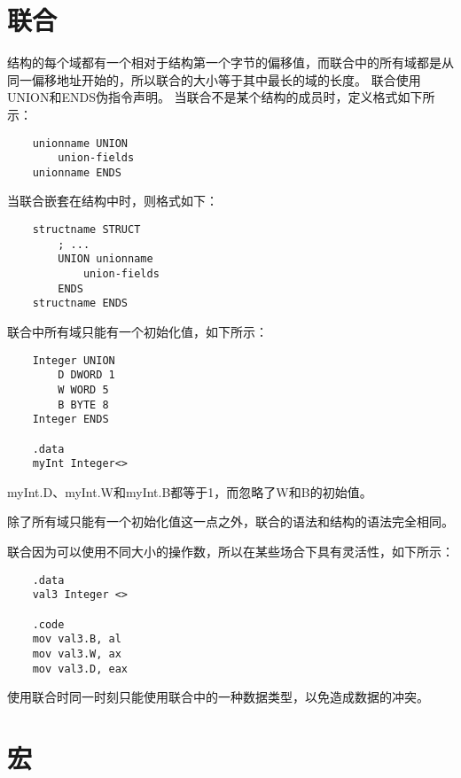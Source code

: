 \documentclass[a4paper,left=2.5cm,right=2.5cm,11pt]{article}
\begin{document}
\section{联合}
	结构的每个域都有一个相对于结构第一个字节的偏移值，而联合中的所有域都是从同一偏移地址开始的，所以联合的大小等于其中最长的域的长度。
	联合使用UNION和ENDS伪指令声明。
	当联合不是某个结构的成员时，定义格式如下所示：
	\begin{lstlisting}
	unionname UNION
		union-fields
	unionname ENDS
	\end{lstlisting}

	当联合嵌套在结构中时，则格式如下：
	\begin{lstlisting}
	structname STRUCT
		; ...
		UNION unionname
			union-fields
		ENDS
	structname ENDS
	\end{lstlisting}

	联合中所有域只能有一个初始化值，如下所示：
	\begin{lstlisting}
	Integer UNION
		D DWORD 1
		W WORD 5
		B BYTE 8
	Integer ENDS

	.data
	myInt Integer<>
	\end{lstlisting}

	myInt.D、myInt.W和myInt.B都等于1，而忽略了W和B的初始值。\par

	除了所有域只能有一个初始化值这一点之外，联合的语法和结构的语法完全相同。\par

	联合因为可以使用不同大小的操作数，所以在某些场合下具有灵活性，如下所示：
	\begin{lstlisting}
	.data
	val3 Integer <>

	.code
	mov val3.B, al
	mov val3.W, ax
	mov val3.D, eax
	\end{lstlisting}

	使用联合时同一时刻只能使用联合中的一种数据类型，以免造成数据的冲突。

\section{宏}
	
\end{document}
